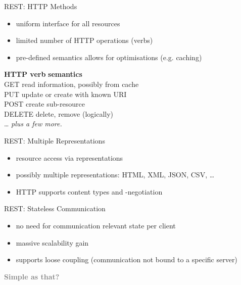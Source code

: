 \documentclass{beamer}
\begin{document}
\begin{frame}{REST: HTTP Methods}
  \begin{itemize}
    \item uniform interface for all resources
    \item limited number of HTTP operations (verbs)
    \item pre-defined semantics allows for optimisations (e.g. caching)
  \end{itemize}

  \begin{tabbing}
    {\bfseries HTTP verb} \hspace{0.3cm} \= {\bfseries semantics} \\
    GET    \>  read information, possibly from cache\\
    PUT    \>  update or create with known URI\\
    POST   \>  create sub-resource \\
    DELETE \>  delete, remove (logically)\\
    \dots  \>  \textit{plus a few more.}
  \end{tabbing}
\end{frame}

\begin{frame}{REST: Multiple Representations}
  \begin{itemize}
    \item resource access via representations
    \item possibly multiple representations: HTML, XML, JSON, CSV, \dots
    \item HTTP supports content types and -negotiation
  \end{itemize}
\end{frame}

\begin{frame}{REST: Stateless Communication}

  \begin{itemize}
    \item no need for communication relevant state per client
    \item massive scalability gain
    \item supports loose coupling (communication not bound to a specific server)
  \end{itemize}
\end{frame}

\begin{frame}
  \vspace*{-1cm}
  \textcolor{gray}{
    \begin{center}
      \textbf{
        \fontsize{60}{60}\selectfont Simple as that?
      }
    \end{center}
  }
\end{frame}
\end{document}
